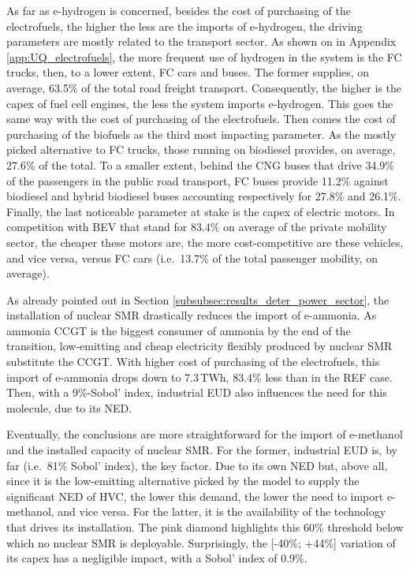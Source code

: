 \documentclass[11pt,twoside,a4paper,english]{article}
\def\ie{i.e.\ }
\begin{document}
As far as e-hydrogen is concerned, besides the cost of purchasing of the electrofuels, the higher the less are the imports of e-hydrogen, the driving parameters are mostly related to the transport sector. As shown on  in Appendix \ref{app:UQ_electrofuels}, the more frequent use of hydrogen in the system is the \gls{FC} trucks, then, to a lower extent, \gls{FC} cars and buses. The former supplies, on average, 63.5\% of the total road freight transport. Consequently, the higher is the capex of fuel cell engines, the less the system imports e-hydrogen. This goes the same way with the cost of purchasing of the electrofuels. Then comes the cost of purchasing of the biofuels as the third most impacting parameter. As the mostly picked alternative to \gls{FC} trucks, those running on biodiesel provides, on average, 27.6\% of the total. To a smaller extent, behind the \gls{CNG} buses that drive 34.9\% of the passengers in the public road transport, \gls{FC} buses provide 11.2\% against biodiesel and hybrid biodiesel buses accounting respectively for 27.8\% and 26.1\%. Finally, the last noticeable parameter at stake is the capex of electric motors. In competition with \gls{BEV} that stand for 83.4\% on average of the private mobility sector, the cheaper these motors are, the more cost-competitive are these vehicles, and vice versa, versus \gls{FC} cars (\ie 13.7\% of the total passenger mobility, on average).

As already pointed out in Section \ref{subsubsec:results_deter_power_sector}, the installation of nuclear SMR drastically reduces the import of e-ammonia. As ammonia \gls{CCGT} is the biggest consumer of ammonia by the end of the transition, low-emitting and cheap electricity flexibly produced by nuclear SMR substitute the \gls{CCGT}. With higher cost of purchasing of the electrofuels, this import of e-ammonia drops down to 7.3\,TWh, 83.4\% less than in the REF case. Then, with a 9\%-Sobol' index, industrial \gls{EUD} also influences the need for this molecule, due to its \gls{NED}.

Eventually, the conclusions are more straightforward for the import of e-methanol and the installed capacity of nuclear SMR. For the former, industrial \gls{EUD} is, by far (\ie 81\% Sobol' index), the key factor. Due to its own \gls{NED} but, above all, since it is the low-emitting alternative picked by the model to supply the significant \gls{NED} of \gls{HVC}, the lower this demand, the lower the need to import e-methanol, and vice versa. For the latter, it is the availability of the technology that drives its installation. The pink diamond highlights this 60\% threshold below which no nuclear SMR is deployable. Surprisingly, the [-40\%; +44\%]  variation of its capex has a negligible impact, with a Sobol' index of 0.9\%.
\end{document}
